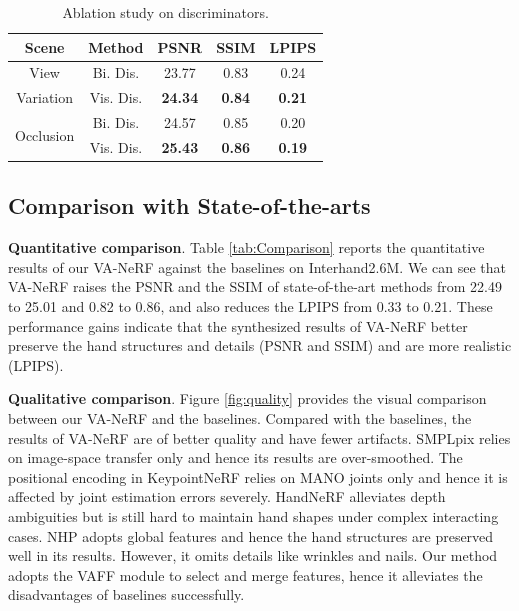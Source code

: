 \documentclass[letterpaper]{article} %
\begin{document}
\begin{table}[t]
\centering
\caption{Ablation study on discriminators.}
\label{tab:disc}
\begin{tabular}{ccccc}
\toprule
Scene  & Method & PSNR    & SSIM    & LPIPS     \\
\midrule
View & Bi. Dis. &  23.77  &  0.83  &  0.24  \\ \cline{2-5}
Variation & Vis. Dis.  &  \textbf{24.34}  &  \textbf{0.84}   &  \textbf{0.21}     \\ \hline
\multirow[c]{2}{*}{Occlusion} & Bi. Dis. &  24.57  &  0.85  &  0.20  \\ \cline{2-5}
 & Vis. Dis.  &  \textbf{25.43}   &  \textbf{0.86}  &  \textbf{0.19}    \\
\bottomrule
\end{tabular}
\end{table}



\subsection{Comparison with State-of-the-arts}

\textbf{Quantitative comparison}. Table \ref{tab:Comparison} reports the quantitative results of our VA-NeRF against the baselines on Interhand2.6M. We can see that VA-NeRF raises the PSNR and the SSIM of state-of-the-art methods from 22.49 to 25.01 and 0.82 to 0.86, and also reduces the LPIPS from 0.33 to 0.21. These performance gains indicate that the synthesized results of VA-NeRF better preserve the hand structures and details (PSNR and SSIM) and are more realistic (LPIPS).

\noindent\textbf{Qualitative comparison}. Figure \ref{fig:quality} provides the visual comparison between our VA-NeRF and the baselines. Compared with the baselines, the results of VA-NeRF are of better quality and have fewer artifacts. SMPLpix relies on image-space transfer only and hence its results are over-smoothed. The positional encoding in KeypointNeRF relies on MANO joints only and hence it is affected by joint estimation errors severely. HandNeRF alleviates depth ambiguities but is still hard to maintain hand shapes under complex interacting cases. NHP adopts global features and hence the hand structures are preserved well in its results. However, it omits details like wrinkles and nails. Our method adopts the VAFF module to select and merge features, hence it alleviates the disadvantages of baselines successfully. 
\end{document}
